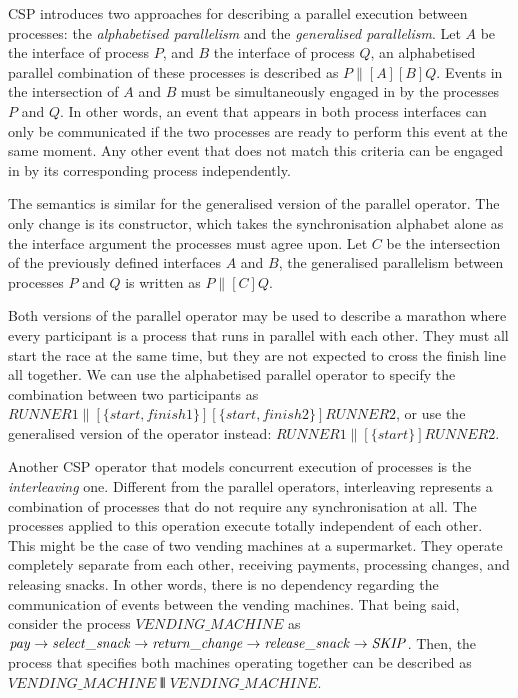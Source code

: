 CSP introduces two approaches for describing a parallel execution between processes: the \emph{alphabetised parallelism} and the \emph{generalised parallelism}. Let $ A $ be the interface of process $ P $, and $ B $ the interface of process $ Q $, an alphabetised parallel combination of these processes is described as $ P \parallel[A][B] Q $. Events in the intersection of $ A $ and $ B $ must be simultaneously engaged in by the processes $ P $ and $ Q $. In other words, an event that appears in both process interfaces can only be communicated if the two processes are ready to perform this event at the same moment. Any other event that does not match this criteria can be engaged in by its corresponding process independently.

The semantics is similar for the generalised version of the parallel operator. The only change is its constructor, which takes the synchronisation alphabet alone as the interface argument the processes must agree upon. Let $ C $ be the intersection of the previously defined interfaces $ A $ and $ B $, the generalised parallelism between processes $ P $ and $ Q $ is written as $ P \parallel[C] Q $.

Both versions of the parallel operator may be used to describe a marathon where every participant is a process that runs in parallel with each other. They must all start the race at the same time, but they are not expected to cross the finish line all together. We can use the alphabetised parallel operator to specify the combination between two participants as $ \mathit{RUNNER1} \parallel[\{start, finish1\}][\{start, finish2\}] \mathit{RUNNER2} $, or use the generalised version of the operator instead: $ \mathit{RUNNER1} \parallel[\{start\}] \mathit{RUNNER2} $.

Another CSP operator that models concurrent execution of processes is the \emph{interleaving} one. Different from the parallel operators, interleaving represents a combination of processes that do not require any synchronisation at all. The processes applied to this operation execute totally independent of each other. This might be the case of two vending machines at a supermarket. They operate completely separate from each other, receiving payments, processing changes, and releasing snacks. In other words, there is no dependency regarding the communication of events between the vending machines. That being said, consider the process $ \mathit{VENDING\_MACHINE} $ as $ \mathit{pay} \mathrel{\rightarrow} \mathit{select\_snack} \mathrel{\rightarrow} \mathit{return\_change} \mathrel{\rightarrow} \mathit{release\_snack} \mathrel{\rightarrow} \mathit{\mathord{{SKIP}}} $. Then, the process that specifies both machines operating together can be described as $ \mathit{VENDING\_MACHINE} \interleave \mathit{VENDING\_MACHINE} $.

